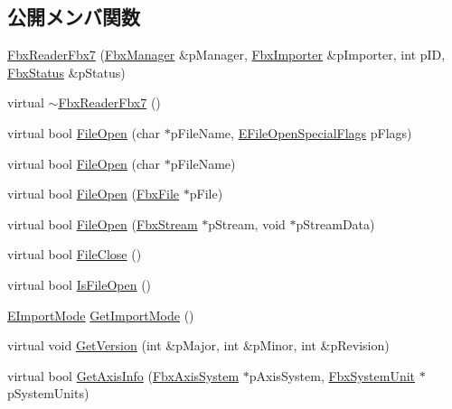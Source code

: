 \subsection*{公開メンバ関数}
\begin{DoxyCompactItemize}
\item 
\hyperlink{class_fbx_reader_fbx7_aa470c2f9e4b688ee385df2c4ebc8b65f}{Fbx\+Reader\+Fbx7} (\hyperlink{class_fbx_manager}{Fbx\+Manager} \&p\+Manager, \hyperlink{class_fbx_importer}{Fbx\+Importer} \&p\+Importer, int p\+ID, \hyperlink{class_fbx_status}{Fbx\+Status} \&p\+Status)
\item 
virtual \hyperlink{class_fbx_reader_fbx7_a2f170d676741aef4b179e0055734392a}{$\sim$\+Fbx\+Reader\+Fbx7} ()
\item 
virtual bool \hyperlink{class_fbx_reader_fbx7_a003c93fdf81dc99380d0276e7643ac26}{File\+Open} (char $\ast$p\+File\+Name, \hyperlink{class_fbx_reader_a1a14bd907bcda7dd48ba9b0a6236b7b8}{E\+File\+Open\+Special\+Flags} p\+Flags)
\item 
virtual bool \hyperlink{class_fbx_reader_fbx7_a06899ecd549ba92789673586d05825cb}{File\+Open} (char $\ast$p\+File\+Name)
\item 
virtual bool \hyperlink{class_fbx_reader_fbx7_a6f6a6de8ff027f552341f0909bdf54b4}{File\+Open} (\hyperlink{class_fbx_file}{Fbx\+File} $\ast$p\+File)
\item 
virtual bool \hyperlink{class_fbx_reader_fbx7_a3ae495d359793c9389f02a1ed1e435ff}{File\+Open} (\hyperlink{class_fbx_stream}{Fbx\+Stream} $\ast$p\+Stream, void $\ast$p\+Stream\+Data)
\item 
virtual bool \hyperlink{class_fbx_reader_fbx7_a06f5323e8d483a1103d54fc53cceadc9}{File\+Close} ()
\item 
virtual bool \hyperlink{class_fbx_reader_fbx7_a0b476396dddc5ed76720e28770535a10}{Is\+File\+Open} ()
\item 
\hyperlink{class_fbx_reader_fbx7_adac979509eca2b6dd882c24364e04a3a}{E\+Import\+Mode} \hyperlink{class_fbx_reader_fbx7_ac4e0596c58d85b554e3236998003cedb}{Get\+Import\+Mode} ()
\item 
virtual void \hyperlink{class_fbx_reader_fbx7_a73f54d9a13bac3952f78983ec07b6d5c}{Get\+Version} (int \&p\+Major, int \&p\+Minor, int \&p\+Revision)
\item 
virtual bool \hyperlink{class_fbx_reader_fbx7_aa57c715aa82bd42dbe1df860296ad8be}{Get\+Axis\+Info} (\hyperlink{class_fbx_axis_system}{Fbx\+Axis\+System} $\ast$p\+Axis\+System, \hyperlink{class_fbx_system_unit}{Fbx\+System\+Unit} $\ast$p\+System\+Units)
\item 

\end{DoxyCompactItemize}
